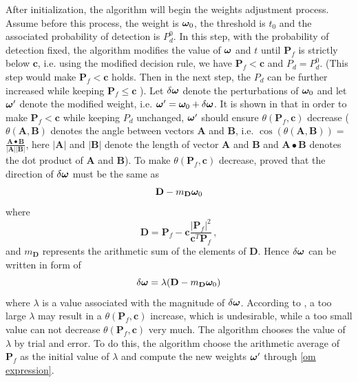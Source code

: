 After initialization, the algorithm will begin the weights adjustment process. 
Assume before this process, the weight is $\boldsymbol{\omega}_0$, the threshold is $t_0$ and the associated probability of detection is $P_d^0$.
In this step, with the probability of detection fixed, the algorithm modifies the value of $\boldsymbol{\omega}$ and $t$ until $\mathbf{P}_f$ is strictly below $ \mathbf{c}$, i.e. using the modified decision rule, we have $\mathbf{P}_f < \mathbf{c}$ and $P_d = P_d^0$. (This step would make $\mathbf{P}_f < \mathbf{c}$ holds. Then in the next step, the $P_d$ can be further increased while keeping $\mathbf{P}_f \leq \mathbf{c}$ \cite{zhang2000efficient}). 
Let $\delta\boldsymbol{\omega}$ denote the perturbations of $\boldsymbol{\omega}_0$ and let $\boldsymbol{\omega}'$ denote the modified weight, i.e. $\boldsymbol{\omega}' = \boldsymbol{\omega}_0 + \delta\boldsymbol{\omega}$.  It is shown in \cite{zhang2000efficient} that in order to make $\mathbf{P}_f < \mathbf{c}$ while keeping $P_d$ unchanged, $\boldsymbol{\omega}'$ should ensure $\theta(\mathbf{P}_f, \mathbf{c})$ decrease ($\theta(\mathbf{A}, \mathbf{B})$ denotes the angle between vectors $\mathbf{A}$ and $\mathbf{B}$, i.e. 
$\cos (\theta(\mathbf{A}, \mathbf{B})) =$ 
$\frac{\mathbf{A}\bullet \mathbf{B}}{|\mathbf{A}||\mathbf{B}|}$,
here $|\mathbf{A}|$ and $|\mathbf{B}|$ denote the length of vector $\mathbf{A}$ and $\mathbf{B}$ and $\mathbf{A}\bullet \mathbf{B}$ denotes the dot product of $\mathbf{A}$ and $\mathbf{B}$). To make $\theta(\mathbf{P}_f, \mathbf{c})$ decrease, \cite{zhang2000efficient} proved that the direction of $\delta\boldsymbol{\omega}$ must be the same as
\begin{equation}
\label{direction}
\mathbf{D} - m_\mathbf{D}\boldsymbol{\omega}_0
\end{equation}
where 
\[
\mathbf{D} = \mathbf{P}_f - \mathbf{c}\frac{|\mathbf{P}_f|^2}{\mathbf{c}^T\mathbf{P}_f}\,,
\]
and $m_{\mathbf{D}}$ represents the arithmetic sum of the elements of $\mathbf{D}$. Hence $\delta\boldsymbol{\omega}$ can be written in form of 
\begin{equation}
\label{om expression}
\delta\boldsymbol{\omega} = \lambda( \mathbf{D} - m_\mathbf{D}\boldsymbol{\omega}_0) 
\end{equation}
where $\lambda$ is a value associated with the magnitude of $\delta\boldsymbol{\omega}$.
According to \cite{zhang2000efficient}, a too large $\lambda$ may result in a  $\theta(\mathbf{P}_f, \mathbf{c})$ increase, which is undesirable, while a too small value can not decrease $\theta(\mathbf{P}_f, \mathbf{c})$ very much. The algorithm chooses the value of $\lambda$ by trial and error. To do this, the algorithm choose the arithmetic average of $\mathbf{P}_f$ as the initial value of $\lambda$ and compute the new weights $\boldsymbol{\omega}'$ through \eqref{om expression}. 
